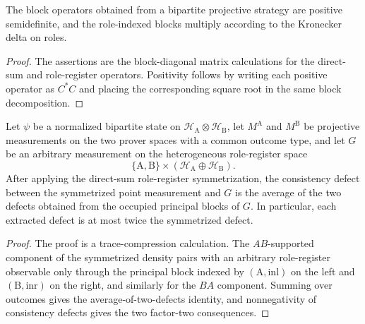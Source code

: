 \begin{lemma}\label{lem:bipartite-strategy-block-identities}
	\leanok
	The block operators obtained from a bipartite projective strategy are
	positive semidefinite, and the role-indexed blocks multiply according to the
	Kronecker delta on roles.
\end{lemma}
\begin{proof}
	\leanok
	The assertions are the block-diagonal matrix calculations for the direct-sum
	and role-register operators. Positivity follows by writing each positive
	operator as $C^*C$ and placing the corresponding square root in the same
	block decomposition.
\end{proof}

\begin{lemma}\label{lem:heterogeneous-role-register-unsymmetrization}
	\leanok
	Let \(\psi\) be a normalized bipartite state on
	\(\mathcal H_{\mathrm A}\otimes\mathcal H_{\mathrm B}\), let
	\(M^{\mathrm A}\) and \(M^{\mathrm B}\) be projective measurements on the two
	prover spaces with a common outcome type, and let \(G\) be an arbitrary
	measurement on the heterogeneous role-register space
	\[
		\{\mathrm A,\mathrm B\}\times(\mathcal H_{\mathrm A}\oplus\mathcal H_{\mathrm B}).
	\]
	After applying the direct-sum role-register symmetrization, the consistency
	defect between the symmetrized point measurement and \(G\) is the average of
	the two defects obtained from the occupied principal blocks of \(G\).  In
	particular, each extracted defect is at most twice the symmetrized defect.
\end{lemma}
\begin{proof}
	\leanok
	The proof is a trace-compression calculation.  The \(AB\)-supported component
	of the symmetrized density pairs with an arbitrary role-register observable
	only through the principal block indexed by
	\((\mathrm A,\mathrm{inl})\) on the left and
	\((\mathrm B,\mathrm{inr})\) on the right, and similarly for the \(BA\)
	component.  Summing over outcomes gives the average-of-two-defects identity,
	and nonnegativity of consistency defects gives the two factor-two
	consequences.
\end{proof}

